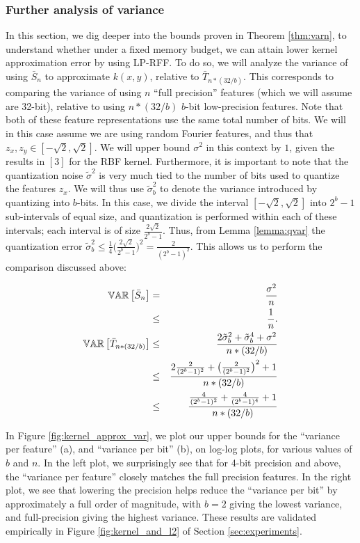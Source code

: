 \documentclass[12pt]{article}
\newcommand{\bS}{\bar{S}}
\newcommand{\bT}{\bar{T}}
\newcommand{\sq}{\sqrt{2}}
\newcommand{\tsigma}{\tilde{\sigma}}
\begin{document}
\subsubsection{Further analysis of variance}
In this section, we dig deeper into the bounds proven in Theorem \ref{thm:varn}, to understand whether under a fixed memory budget, we can attain lower kernel approximation error by using LP-RFF.
To do so, we will analyze the variance of using $\bS_n$ to approximate $k(x,y)$, relative to $\bT_{n*(32/b)}$.  This corresponds to comparing the variance of using $n$ ``full precision''  features (which we will assume are 32-bit), relative to using $n*(32/b)$ $b$-bit low-precision features. Note that both of these feature representations use the same total number of bits.  We will in this case assume we are using random Fourier features, and thus that
$z_x,z_y \in [-\sq,\sq]$.  We will upper bound $\sigma^2$ in this context by $1$, given the results in $[3]$ for the RBF kernel.  Furthermore, it is important to note that the quantization noise $\tsigma^2$ is very much tied to the number of bits used to quantize the features $z_x$.  We will thus use $\tsigma_b^2$ to denote the variance introduced by quantizing into $b$-bits.  In this case, we divide the interval $[-\sq,\sq]$ into $2^b-1$ sub-intervals of equal size, and quantization is performed within each of these intervals; each interval is of size $\frac{2\sq}{2^b-1}$. 
Thus, from Lemma \ref{lemma:qvar} the quantization error $\tsigma_b^2 \leq \frac{1}{4}\Big(\frac{2\sq}{2^b-1}\Big)^2 = \frac{2}{(2^b-1)^2}$.  This allows us to perform the comparison discussed above:

\begin{eqnarray*}
	\var{}{\bS_n} &=& \frac{\sigma^2}{n} \\
	&\leq& \frac{1}{n}. \\
	\var{}{\bT_{n*(32/b)}} &\leq& \frac{2\tsigma_b^2 + \tsigma_b^4 +  \sigma^2}{n*(32/b)} \\
	&\leq& \frac{2\frac{2}{(2^b-1)^2}  + \big(\frac{2}{(2^b-1)^2}\big)^2+ 1}{n*(32/b)}\\
	&\leq& \frac{\frac{4}{(2^b-1)^2} + \frac{4}{(2^b-1)^4} +  1}{n*(32/b)}\\
\end{eqnarray*}

In Figure \ref{fig:kernel_approx_var}, we plot our upper bounds for the ``variance per feature'' (a), and ``variance per bit'' (b), on log-log plots, for various values of $b$ and $n$.
In the left plot, we surprisingly see that for 4-bit precision and above, the ``variance per feature'' closely matches the full precision features.  In the right plot, we see that lowering the precision helps reduce the ``variance per bit'' by approximately a full order of magnitude, with $b=2$ giving the lowest variance, and full-precision giving the highest variance.  These results are validated empirically in Figure \ref{fig:kernel_and_l2} of Section \ref{sec:experiments}.
\end{document}
